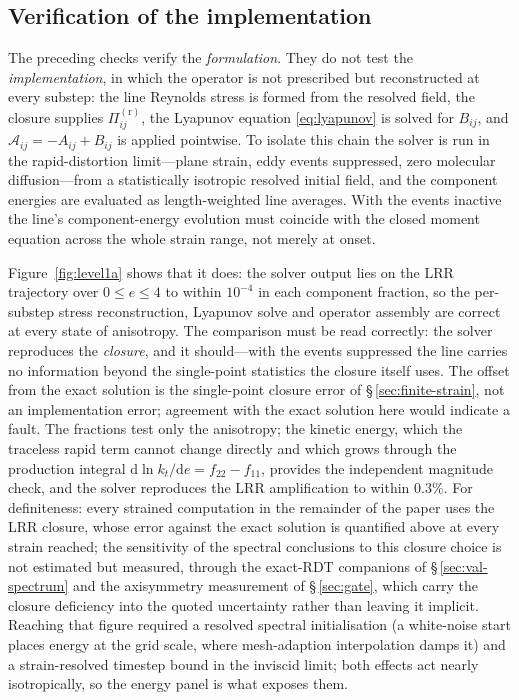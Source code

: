 \documentclass[11pt,a4paper]{article}
\begin{document}
\subsection{Verification of the implementation}\label{sec:level1a}

The preceding checks verify the \emph{formulation}. They do not test the
\emph{implementation}, in which the operator is not prescribed but
reconstructed at every substep: the line Reynolds stress is formed from
the resolved field, the closure supplies $\Pi^{(\mathrm r)}_{ij}$, the
Lyapunov equation \eqref{eq:lyapunov} is solved for $B_{ij}$, and
$\mathcal{A}_{ij}=-A_{ij}+B_{ij}$ is applied pointwise. To isolate this
chain the solver is run in the rapid-distortion limit---plane strain,
eddy events suppressed, zero molecular diffusion---from a statistically
isotropic resolved initial field, and the component energies are
evaluated as length-weighted line averages. With the events inactive the
line's component-energy evolution must coincide with the closed moment
equation across the whole strain range, not merely at onset.

Figure~\ref{fig:level1a} shows that it does: the solver output lies on
the LRR trajectory over $0\le e\le4$ to within $10^{-4}$ in each
component fraction, so the per-substep stress reconstruction, Lyapunov
solve and operator assembly are correct at every state of anisotropy.
The comparison must be read correctly: the solver reproduces the
\emph{closure}, and it should---with the events suppressed the line
carries no information beyond the single-point statistics the closure
itself uses. The offset from the exact solution is the single-point
closure error of \S\,\ref{sec:finite-strain}, not an implementation
error; agreement with the exact solution here would indicate a fault.
The fractions test only the anisotropy; the kinetic energy, which the
traceless rapid term cannot change directly and which grows through the
production integral
$\mathrm{d}\ln k_t/\mathrm{d}e=f_{22}-f_{11}$, provides the independent
magnitude check, and the solver reproduces the LRR amplification to
within $0.3\%$. For definiteness: every strained computation in the
remainder of the paper uses the LRR closure, whose error against the
exact solution is quantified above at every strain reached; the
sensitivity of the spectral conclusions to this closure choice is not
estimated but measured, through the exact-RDT companions of
\S\,\ref{sec:val-spectrum} and the axisymmetry measurement of
\S\,\ref{sec:gate}, which carry the closure deficiency into the quoted
uncertainty rather than leaving it implicit. Reaching that figure required a resolved spectral
initialisation (a white-noise start places energy at the grid scale,
where mesh-adaption interpolation damps it) and a strain-resolved
timestep bound in the inviscid limit; both effects act nearly
isotropically, so the energy panel is what exposes them.
\end{document}
